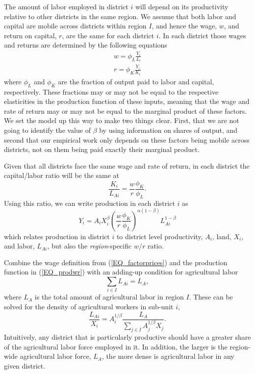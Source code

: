\documentclass[11pt]{article}
\begin{document}
The amount of labor employed in district $i$ will depend on its productivity relative to other districts in the same region. We assume that both labor and capital are mobile across districts within region $I$, and hence the wage, $w$, and return on capital, $r$, are the same for each district $i$. In each district those wages and returns are determined by the following equations
\begin{eqnarray}
    w = \phi_L \frac{Y_i}{L_i} \\ \nonumber
    r = \phi_K \frac{Y_i}{K_i} \label{EQ_factorprices}
\end{eqnarray}
where $\phi_L$ and $\phi_K$ are the fraction of output paid to labor and capital, respectively. These fractions may or may not be equal to the respective elasticities in the production function of these inputs, meaning that the wage and rate of return may or may not be equal to the marginal product of these factors. We set the model up this way to make two things clear. First, that we are not going to identify the value of $\beta$ by using information on shares of output, and second that our empirical work only depends on these factors being mobile across districts, not on them being paid exactly their marginal product.

Given that all districts face the same wage and rate of return, in each district the capital/labor ratio will be the same at
\begin{equation}
    \frac{K_i}{L_{Ai}} = \frac{w}{r}\frac{\phi_K}{\phi_L}.
\end{equation}
Using this ratio, we can write production in each district $i$ as
\begin{equation}
Y_{i} = A_{i} X_{i}^{\beta} \left(\frac{w}{r}\frac{\phi_K}{\phi_L}\right)^{\alpha(1-\beta)} L_{Ai}^{1-\beta} \label{EQ_prodwr}
\end{equation}
which relates production in district $i$ to district level productivity, $A_i$, land, $X_i$, and labor, $L_{Ai}$, but also the \textit{region}-specific $w/r$ ratio.

Combine the wage definition from (\ref{EQ_factorprices}) and the production function in (\ref{EQ_prodwr}) with an adding-up condition for agricultural labor 
\begin{equation}
\sum_{i\in I} L_{Ai} = L_A,
\end{equation}
where $L_A$ is the total amount of agricultural labor in region $I$. These can be solved for the density of agricultural workers in sub-unit $i$,
\begin{equation}
\frac{L_{Ai}}{X_i} = A_{i}^{1/\beta}\frac{L_A}{\sum_{j\in I} A_{j}^{1/\beta}X_{j}}. \label{EQ_LaX}
\end{equation}
Intuitively, any district that is particularly productive should have a greater share of the agricultural labor force employed in it. In addition, the larger is the region-wide agricultural labor force, $L_A$, the more dense is agricultural labor in any given district.
\end{document}
